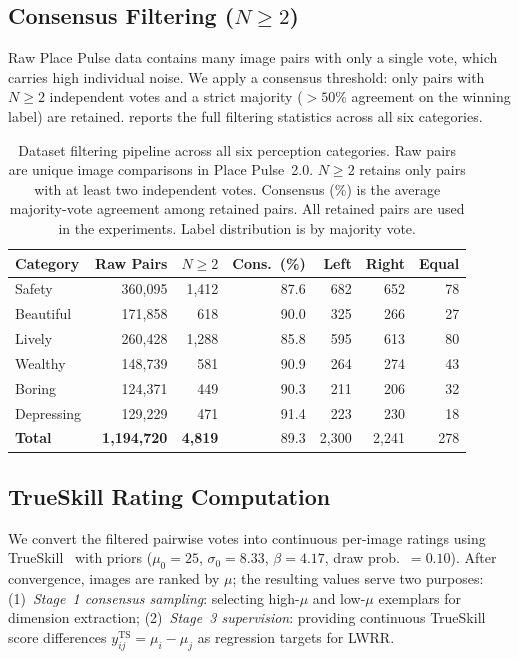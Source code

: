 \documentclass[runningheads]{llncs}
\begin{document}
\subsection{Consensus Filtering ($N \geq 2$)}

Raw Place Pulse data contains many image pairs with only a single vote, which carries high individual noise.
We apply a consensus threshold: only pairs with $N \geq 2$ independent votes and a strict majority ($> 50\%$ agreement on the winning label) are retained.
 reports the full filtering statistics across all six categories.

\begin{table}[H]
\centering
\caption{Dataset filtering pipeline across all six perception categories. Raw pairs are unique image comparisons in Place Pulse~2.0. $N{\geq}2$ retains only pairs with at least two independent votes. Consensus (\%) is the average majority-vote agreement among retained pairs. All retained pairs are used in the experiments. Label distribution is by majority vote.}
\label{tab:consensus}
\small
\setlength{\tabcolsep}{3.5pt}
\begin{tabular}{lrrrrrr}
\toprule
Category & Raw Pairs & $N{\geq}2$ & Cons.\ (\%) & Left & Right & Equal \\
\midrule
Safety      & 360,095 & 1,412 & 87.6 & 682 & 652 & 78 \\
Beautiful   & 171,858 &   618 & 90.0 & 325 & 266 & 27 \\
Lively      & 260,428 & 1,288 & 85.8 & 595 & 613 & 80 \\
Wealthy     & 148,739 &   581 & 90.9 & 264 & 274 & 43 \\
Boring      & 124,371 &   449 & 90.3 & 211 & 206 & 32 \\
Depressing  & 129,229 &   471 & 91.4 & 223 & 230 & 18 \\
\midrule
\textbf{Total} & \textbf{1,194,720} & \textbf{4,819} & 89.3 & 2,300 & 2,241 & 278 \\
\bottomrule
\end{tabular}
\end{table}

\subsection{TrueSkill Rating Computation}

We convert the filtered pairwise votes into continuous per-image ratings using TrueSkill~\cite{herbrich2006trueskill} with priors
($\mu_0{=}25$, $\sigma_0{=}8.33$, $\beta{=}4.17$, draw prob.\ $=0.10$).
After convergence, images are ranked by $\mu$; the resulting values serve two purposes:
(1)~\emph{Stage~1 consensus sampling}: selecting high-$\mu$ and low-$\mu$ exemplars for dimension extraction;
(2)~\emph{Stage~3 supervision}: providing continuous TrueSkill score differences $y^{\mathrm{TS}}_{ij} {=} \mu_i {-} \mu_j$ as regression targets for LWRR.
\end{document}
